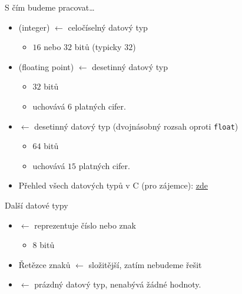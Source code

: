 \documentclass[14pt,aspectratio=169]{beamer}
\begin{document}
    \begin{frame}[t]{S čím budeme pracovat\dots}
        \begin{itemize}
            \item {} (integer) $\leftarrow$ celočíselný datový typ
            \begin{itemize}
                \item $16$ nebo $32$ bitů (typicky $32$)
            \end{itemize}
            \item {} (floating point) $\leftarrow$ desetinný datový typ
            \begin{itemize}
                \item $32$ bitů
                \item uchovává $6$ platných cifer.
            \end{itemize}
            \item {} $\leftarrow$ desetinný datový typ (dvojnásobný rozsah oproti \texttt{float})
            \begin{itemize}
                \item $64$ bitů
                \item uchovává $15$ platných cifer.
            \end{itemize}
            \item Přehled všech datových typů v C (pro zájemce): \href{https://en.wikipedia.org/wiki/C_data_types}{\underline{zde}}
        \end{itemize}
    \end{frame}

    \begin{frame}[t]{Další datové typy}
        \begin{itemize}
            \item {} $\leftarrow$ reprezentuje číslo nebo znak
            \begin{itemize}
                \item 8 bitů
            \end{itemize}
            \item Řetězce znaků \texttt{\markorange{\textquotedblleft\dots\textquotedblright}} $\leftarrow$ složitější, zatím nebudeme řešit 
            \item {} $\leftarrow$ prázdný datový typ, nenabývá žádné hodnoty.
        \end{itemize}
    \end{frame}
\end{document}
